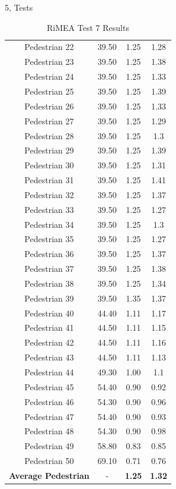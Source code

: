 \documentclass[10pt,a4paper]{article}
\begin{document}
\begin{task}{5, Tests}
\begin{table}[ht!]
\begin{tabular}{ |c|c|c|c| }
            Pedestrian 22 & 39.50 & 1.25 & 1.28\\
            Pedestrian 23 & 39.50 & 1.25 & 1.38\\
            Pedestrian 24 & 39.50 & 1.25 & 1.33\\
            Pedestrian 25 & 39.50 & 1.25 & 1.39\\
            Pedestrian 26 & 39.50 & 1.25 & 1.33\\
            Pedestrian 27 & 39.50 & 1.25 & 1.29\\
            Pedestrian 28 & 39.50 & 1.25 & 1.3\\
            Pedestrian 29 & 39.50 & 1.25 & 1.39\\
            Pedestrian 30 & 39.50 & 1.25 & 1.31\\
            Pedestrian 31 & 39.50 & 1.25 & 1.41\\
            Pedestrian 32 & 39.50 & 1.25 & 1.37\\
            Pedestrian 33 & 39.50 & 1.25 & 1.27\\
            Pedestrian 34 & 39.50 & 1.25 & 1.3\\
            Pedestrian 35 & 39.50 & 1.25 & 1.27\\
            Pedestrian 36 & 39.50 & 1.25 & 1.37\\
            Pedestrian 37 & 39.50 & 1.25 & 1.38\\
            Pedestrian 38 & 39.50 & 1.25 & 1.34\\
            Pedestrian 39 & 39.50 & 1.35 & 1.37\\
            Pedestrian 40 & 44.40 & 1.11 & 1.17\\
            Pedestrian 41 & 44.50 & 1.11 & 1.15\\
            Pedestrian 42 & 44.50 & 1.11 & 1.16\\
            Pedestrian 43 & 44.50 & 1.11 & 1.13\\
            Pedestrian 44 & 49.30 & 1.00 & 1.1\\
            Pedestrian 45 & 54.40 & 0.90 & 0.92\\
            Pedestrian 46 & 54.30 & 0.90 & 0.96\\
            Pedestrian 47 & 54.40 & 0.90 & 0.93\\
            Pedestrian 48 & 54.30 & 0.90 & 0.98\\
            Pedestrian 49 & 58.80 & 0.83 & 0.85\\
            Pedestrian 50 & 69.10 & 0.71 & 0.76\\
            \hline
            \textbf{Average Pedestrian} & - & \textbf{1.25} & \textbf{1.32}\\
            \hline
            \end{tabular}
        \caption{RiMEA Test 7 Results}
    	    \label{tb:rimea7}
    \end{table}
\end{task}

\newpage


\end{document}
